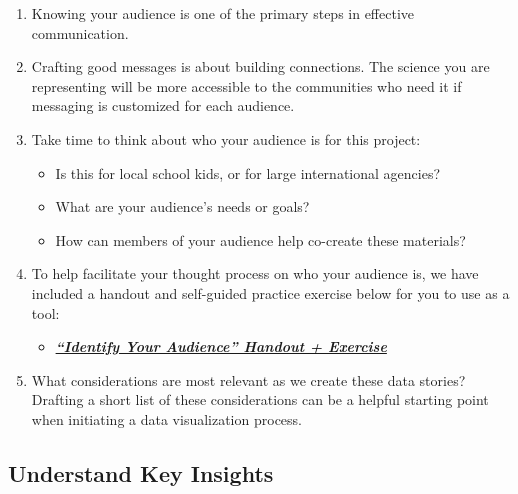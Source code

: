 \documentclass[
]{book}
\providecommand{\tightlist}{%
  \setlength{\itemsep}{0pt}\setlength{\parskip}{0pt}}
\begin{document}
\begin{enumerate}
\def\labelenumi{\arabic{enumi}.}
\tightlist
\item
  Knowing your audience is one of the primary steps in effective communication.
\item
  Crafting good messages is about building connections. The science you are representing will be more accessible to the communities who need it if messaging is customized for each audience.\\
\item
  Take time to think about who your audience is for this project:

  \begin{itemize}
  \tightlist
  \item
    Is this for local school kids, or for large international agencies?
  \item
    What are your audience's needs or goals?
  \item
    How can members of your audience help co-create these materials?
  \end{itemize}
\item
  To help facilitate your thought process on who your audience is, we have included a handout and self-guided practice exercise below for you to use as a tool:

  \begin{itemize}
  \tightlist
  \item
    \href{files/M4S2_Data_Storytelling_Audience_Handout_Exercise.pdf}{\textbf{\emph{``Identify Your Audience'' Handout + Exercise}}}
  \end{itemize}
\item
  What considerations are most relevant as we create these data stories? Drafting a short list of these considerations can be a helpful starting point when initiating a data visualization process.
\end{enumerate}

\hypertarget{understand-key-insights}{%
\subsection{Understand Key Insights}\label{understand-key-insights}}
\end{document}
